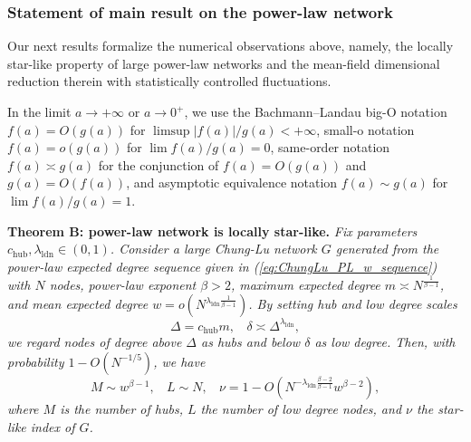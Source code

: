\documentclass[a4paper]{article}
\theoremstyle{plain}
\theoremstyle{definition}
\begin{document}






\subsubsection{Statement of main result on the power-law network} \label{sec:intro_informa_PL}
Our next results formalize the numerical observations above, namely, the locally star-like property of large power-law networks and the mean-field dimensional reduction therein with statistically controlled fluctuations.

In the limit $a\to+\infty$ or $a\to 0^+$, we use the Bachmann–Landau big-O notation $f(a)=O(g(a))$ for $\limsup |f(a)|/g(a) <+\infty$, small-o notation $f(a)=o(g(a))$ for $\lim f(a)/g(a)=0$, same-order notation $f(a) \asymp g(a)$ for the conjunction of $f(a)=O(g(a))$ and $g(a)=O(f(a))$, and asymptotic equivalence notation $f(a)\sim g(a)$ for $\lim f(a)/g(a)=1$.


\textbf{Theorem B: power-law network is locally star-like.} \textit{Fix parameters $c_{\mathrm{hub}},\lambda_{\mathrm{ldn}}\in(0,1)$. Consider a large Chung-Lu network $G$ generated from the power-law expected degree sequence given in (\ref{eq:ChungLu_PL_w_sequence}) with $N$ nodes, power-law exponent $\beta>2$, maximum expected degree $m\asymp  N^{\frac{1}{\beta-1}}$, and mean expected degree $w= o(N^{\lambda_{\mathrm{ldn}}\frac{1}{\beta-1}})$. By setting hub and low degree scales
	$$\Delta=c_{\mathrm{hub}} m,~~~~\delta\asymp \Delta^{\lambda_{\mathrm{ldn}}},$$
	we regard nodes of degree above $\Delta$  as hubs and below $\delta$ as low degree. Then, with probability  $1-O(N^{-1/5})$, 
	we have
	$$M\sim w^{\beta-1},~~~~L\sim N,~~~~\nu= 1 - O\left(N^{-\lambda_{\mathrm{ldn}}\frac{\beta-2}{\beta-1}} w^{\beta-2}\right),$$
	where $M$ is the number of hubs, $L$ the number of low degree nodes, and $\nu$ the star-like index of $G$.}
\end{document}
